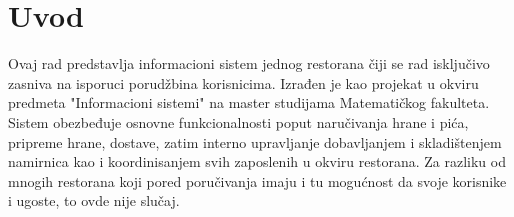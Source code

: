 \setcounter{page}{1}
\section{Uvod}
\par Ovaj rad predstavlja informacioni sistem jednog restorana čiji se rad isključivo zasniva na isporuci porudžbina korisnicima. Izrađen je kao projekat u okviru predmeta "Informacioni sistemi" na master studijama Matematičkog fakulteta. Sistem obezbeđuje osnovne funkcionalnosti poput naručivanja hrane i pića, pripreme hrane, dostave, zatim interno upravljanje dobavlja\-njem i skladištenjem namirnica kao i koordinisanjem  svih zaposlenih u okviru restorana.
Za razliku od mnogih restorana koji pored poručivanja imaju i tu mogućnost da svoje korisnike i ugoste, to ovde nije slučaj.

